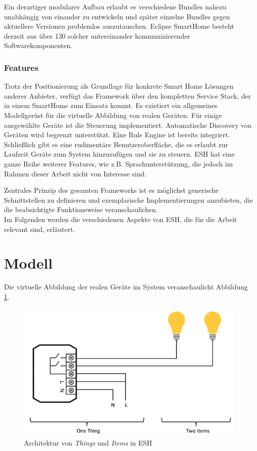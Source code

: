 Ein derartiger modularer Aufbau erlaubt es verschiedene Bundles nahezu unabhängig von einander zu entwickeln und später einzelne Bundles gegen aktuellere Versionen problemlos auszutauschen. Eclipse SmartHome besteht derzeit aus über 130 solcher untereinander kommunizierender Softwarekomponenten.


\subsubsection{Features}
Trotz der Positionierung als Grundlage für konkrete Smart Home Lösungen anderer Anbieter, verfügt das Framework über den kompletten Service Stack, der in einem SmartHome zum Einsatz kommt. Es existiert ein allgemeines Modellgerüst für die virtuelle Abbildung von realen Geräten. Für einige ausgewählte Geräte ist die Steuerung implementiert. Automatische Discovery von Geräten wird begrenzt unterstützt. Eine Rule Engine ist bereits integriert. Schließlich gibt es eine rudimentäre Benutzeroberfläche, die es erlaubt zur Laufzeit Geräte zum System hinzuzufügen und sie zu steuern. ESH hat eine ganze Reihe weiterer Features, wie z.B. Sprachunterstützung, die jedoch im Rahmen dieser Arbeit nicht von Interesse sind. 

Zentrales Prinzip des gesamten Frameworks ist es möglichst generische Schnittstellen zu definieren und exemplarische Implementierungen anzubieten, die die beabsichtigte Funktionsweise veranschaulichen. \\

Im Folgenden werden die verschiedenen Aspekte von ESH, die für die Arbeit relevant sind, erläutert.

\section{Modell}
Die virtuelle Abbildung der realen Geräte im System veranschaulicht Abbildung \ref{fig:esh_model}.

\begin{figure}[h]
	\centering
	\includegraphics[width=\textwidth]{bilder/esh_model}
	\caption{Architektur von \textit{Things} und \textit{Items} in ESH \cite{ESH:home}}
	\label{fig:esh_model}
\end{figure}

